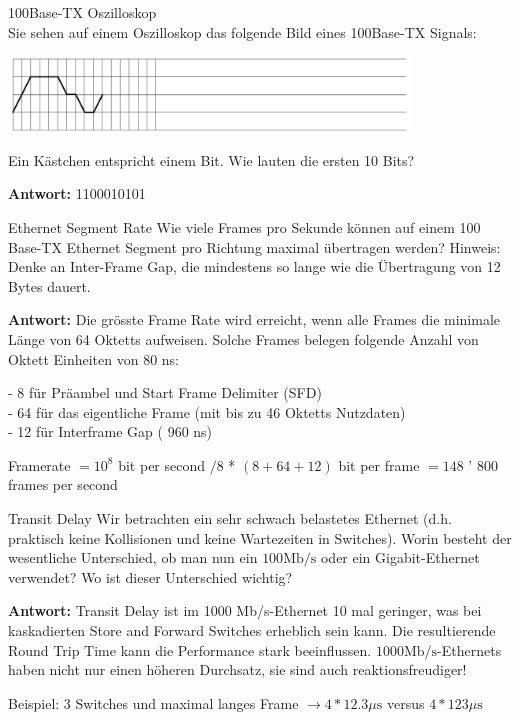 \begin{example2}{100Base-TX Oszilloskop}\\
 Sie sehen auf einem Oszilloskop das folgende Bild eines 100Base-TX Signals:
  \begin{center}
  \includegraphics[width=0.8\textwidth]{images/2024-06-20-17-47-36.png}
  \end{center}
Ein Kästchen entspricht einem Bit. Wie lauten die ersten 10 Bits?

\textbf{Antwort:}
1100010101
\end{example2}


\begin{example2}{Ethernet Segment Rate}
Wie viele Frames pro Sekunde können auf einem 100 Base-TX Ethernet Segment pro Richtung maximal übertragen werden?
Hinweis: Denke an Inter-Frame Gap, die mindestens so lange wie die Übertragung von 12 Bytes dauert.

\textbf{Antwort:}
Die grösste Frame Rate wird erreicht, wenn alle Frames die minimale Länge von 64 Oktetts aufweisen. Solche Frames belegen folgende Anzahl von Oktett Einheiten von 80 ns:

- 8 für Präambel und Start Frame Delimiter (SFD)\\
- 64 für das eigentliche Frame (mit bis zu 46 Oktetts Nutzdaten)\\
- 12 für Interframe Gap ( 960 ns)

Framerate $=10^{8}$ bit per second $/ 8$ * $(8+64+12)$ bit per frame $=148$ ' 800 frames per second
\end{example2}


\begin{example2}{Transit Delay}
Wir betrachten ein sehr schwach belastetes Ethernet (d.h. praktisch keine Kollisionen und keine Wartezeiten in Switches). Worin besteht der wesentliche Unterschied, ob man nun ein $100 \mathrm{Mb} / \mathrm{s}$ oder ein Gigabit-Ethernet verwendet? Wo ist dieser Unterschied wichtig?

\textbf{Antwort:}
Transit Delay ist im 1000 Mb/s-Ethernet 10 mal geringer, was bei kaskadierten Store and Forward Switches erheblich sein kann. Die resultierende Round Trip Time kann die Performance stark beeinflussen. $1000 \mathrm{Mb} / \mathrm{s}$-Ethernets haben nicht nur einen höheren Durchsatz, sie sind auch reaktionsfreudiger!

Beispiel: 3 Switches und maximal langes Frame $\rightarrow 4 * 12.3 \mu \mathrm{s}$ versus $4 * 123 \mu \mathrm{s}$
\end{example2}

